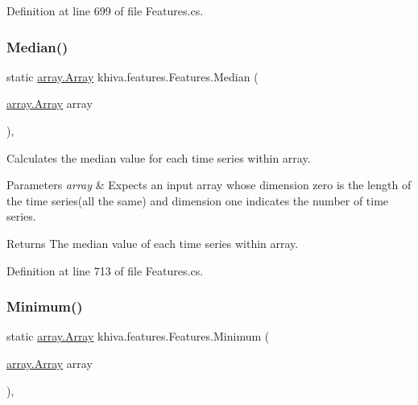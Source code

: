 Definition at line 699 of file Features.\+cs.

\mbox{\label{classkhiva_1_1features_1_1_features_ade195f3e93cb66c5e84900d97aec1e68}} 
\subsubsection{\texorpdfstring{Median()}{Median()}}
{\footnotesize\ttfamily static \mbox{\hyperlink{classkhiva_1_1array_1_1_array}{array.\+Array}} khiva.\+features.\+Features.\+Median (\begin{DoxyParamCaption}\item[{\mbox{\hyperlink{classkhiva_1_1array_1_1_array}{array.\+Array}}}]{array }\end{DoxyParamCaption})\hspace{0.3cm}{\ttfamily [inline]}, {\ttfamily [static]}}



Calculates the median value for each time series within array. 


\begin{DoxyParams}{Parameters}
{\em array} & Expects an input array whose dimension zero is the length of the time series(all the same) and dimension one indicates the number of time series.\\
\hline
\end{DoxyParams}
\begin{DoxyReturn}{Returns}
The median value of each time series within array.
\end{DoxyReturn}


Definition at line 713 of file Features.\+cs.

\mbox{\label{classkhiva_1_1features_1_1_features_a8214d2c861fef7bd0329349031c4d473}} 
\subsubsection{\texorpdfstring{Minimum()}{Minimum()}}
{\footnotesize\ttfamily static \mbox{\hyperlink{classkhiva_1_1array_1_1_array}{array.\+Array}} khiva.\+features.\+Features.\+Minimum (\begin{DoxyParamCaption}\item[{\mbox{\hyperlink{classkhiva_1_1array_1_1_array}{array.\+Array}}}]{array }\end{DoxyParamCaption})\hspace{0.3cm}{\ttfamily [inline]}, {\ttfamily [static]}}



